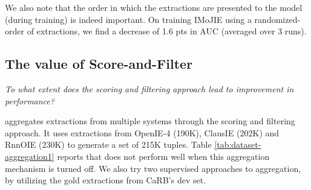         We also note that the order in which the extractions are presented to the model (during training) is indeed important. On training IMoJIE using a randomized-order of extractions, we find a decrease of 1.6 pts in AUC (averaged over 3 runs).

        \vspace{0.5ex}
    \subsection{The value of Score-and-Filter}
        \emph{To what extent does the scoring and filtering approach lead to improvement in performance?} 

        \shortname{} aggregates extractions from multiple systems through the scoring and filtering approach. It uses extractions from OpenIE-4 (190K), ClausIE (202K) and RnnOIE (230K) to generate a set of 215K tuples. Table \ref{tab:dataset-aggregation1} reports that \shortname{} does not perform well when this aggregation mechanism is turned off. We also try two supervised approaches to aggregation, by utilizing the gold extractions from CaRB's dev set.
        
        \begin{table}[h]
            \caption{Performance of \shortname{} on aggregated dataset \textbf{OpenIE-4+ClausIE+RnnOIE}, with different filtering techniques. For comparison, SenseOIE trained on multiple system extractions gives an F1 of 17.2 on CaRB.}
            \label{tab:dataset-aggregation1}
        \end{table}

